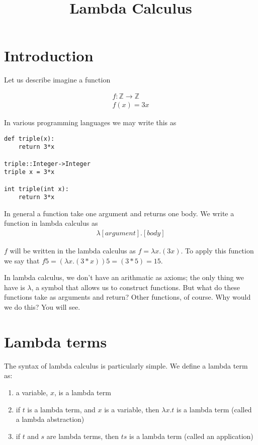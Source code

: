 \documentclass{article}
\title{Lambda Calculus}
\date{}
\begin{document}
\maketitle

\section{Introduction}
Let us describe imagine a function 

\begin{align}
f:\mathbb{Z}\rightarrow\mathbb{Z}\\
f(x) = 3x
\end{align}

In various programming languages we may write this as

\begin{verbatim}
def triple(x):
    return 3*x
    
triple::Integer->Integer
triple x = 3*x

int triple(int x):
    return 3*x
\end{verbatim}

In general a function take one argument and returns one body. We write a function in lambda calculus as 
\begin{align}
\lambda[argument].[body]
\end{align}

$f$ will be written in the lambda calculus as $f = \lambda x.(3x)$. To apply this function we say that $f5 = (\lambda x.(3*x))5 = (3*5) = 15$.

In lambda calculus, we don't have an arithmatic as axioms; the only thing we have is $\lambda$, a symbol that allows us to construct functions. But what do these functions take as arguments and return? Other functions, of course. Why would we do this? You will see.

\section{Lambda terms}

The syntax of lambda calculus is particularly simple. We define a lambda term as:

\begin{enumerate}
\item{a variable, $x$, is a lambda term}
\item{if $t$ is a lambda term, and $x$ is a variable, then $\lambda x.t$ is a lambda term (called a lambda abstraction)}
\item{if $t$ and $s$ are lambda terms, then $ts$ is a lambda term (called an application)}
\end{enumerate}
\end{document}
